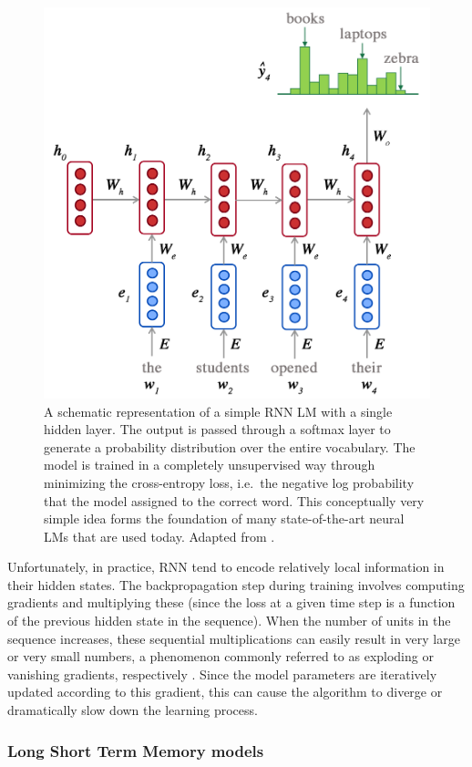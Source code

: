 \documentclass[12pt,a4paper,]{book}
\begin{document}
\begin{figure}

{\centering \includegraphics[width=0.75\linewidth]{images/RNN_LM} 

}

\caption{A schematic representation of a simple RNN LM with a single hidden layer. The output is passed through a softmax layer to generate a probability distribution over the entire vocabulary. The model is trained in a completely unsupervised way through minimizing the cross-entropy loss, i.e.~the negative log probability that the model assigned to the correct word. This conceptually very simple idea forms the foundation of many state-of-the-art neural LMs that are used today. Adapted from \citep{manning2019a}.}\label{fig:rnnlm}
\end{figure}

Unfortunately, in practice, RNN tend to encode relatively local information in their hidden states. The backpropagation step during training involves computing gradients and multiplying these (since the loss at a given time step is a function of the previous hidden state in the sequence). When the number of units in the sequence increases, these sequential multiplications can easily result in very large or very small numbers, a phenomenon commonly referred to as exploding or vanishing gradients, respectively \citep{bengio1993}. Since the model parameters are iteratively updated according to this gradient, this can cause the algorithm to diverge or dramatically slow down the learning process.

\hypertarget{long-short-term-memory-models}{%
\subsubsection{Long Short Term Memory models}\label{long-short-term-memory-models}}
\end{document}
